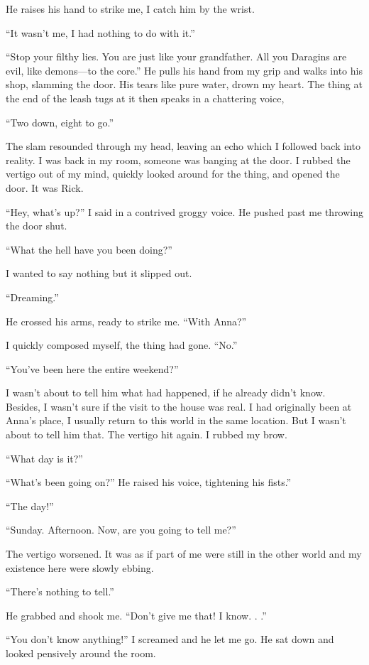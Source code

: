 He raises his hand to strike me, I catch him by the wrist.

``It wasn't me, I had nothing to do with it.''

``Stop your filthy lies. You are just like your grandfather. All you
Daragins are evil, like demons---to the core.'' He pulls his hand from
my grip and walks into his shop, slamming the door. His tears like pure
water, drown my heart. The thing at the end of the leash tugs at it then
speaks in a chattering voice,

``Two down, eight to go.''

The slam resounded through my head, leaving an echo which I followed
back into reality. I was back in my room, someone was banging at the
door. I rubbed the vertigo out of my mind, quickly looked around for the
thing, and opened the door. It was Rick.

``Hey, what's up?'' I said in a contrived groggy voice. He pushed past
me throwing the door shut.

``What the hell have you been doing?''

I wanted to say nothing but it slipped out.

``Dreaming.''

He crossed his arms, ready to strike me. ``With Anna?''

I quickly composed myself, the thing had gone. ``No.''

``You've been here the entire weekend?''

I wasn't about to tell him what had happened, if he already didn't know.
Besides, I wasn't sure if the visit to the house was real. I had
originally been at Anna's place, I usually return to this world in the
same location. But I wasn't about to tell him that. The vertigo hit
again. I rubbed my brow.

``What day is it?''

``What's been going on?'' He raised his voice, tightening his fists.''

``The day!''

``Sunday. Afternoon. Now, are you going to tell me?''

The vertigo worsened. It was as if part of me were still in the other
world and my existence here were slowly ebbing.

``There's nothing to tell.''

He grabbed and shook me. ``Don't give me that! I know. . .''

``You don't know anything!'' I screamed and he let me go. He sat down
and looked pensively around the room.

